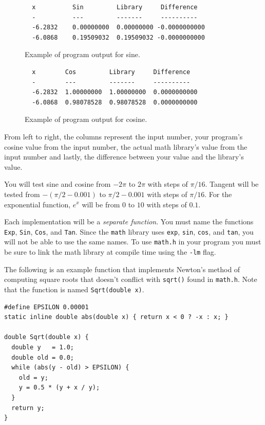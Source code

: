 \documentclass[11pt]{article}
\begin{document}
\begin{figure}[h]
\begin{centering}
  \begin{lstlisting}
  x          Sin         Library     Difference
  -          ---         -------     ----------
  -6.2832	 0.00000000	 0.00000000	-0.0000000000
  -6.0868	 0.19509032	 0.19509032	-0.0000000000\end{lstlisting}
  \caption{Example of program output for sine.}\label{sine}
\end{centering}
\end{figure}

\begin{figure}[h]
\begin{centering}
  \begin{lstlisting}
  x        Cos         Library     Difference
  -        ---         -------     ----------
  -6.2832  1.00000000  1.00000000  0.0000000000
  -6.0868  0.98078528  0.98078528  0.0000000000\end{lstlisting}
  \caption{Example of program output for cosine.}\label{cosine}
\end{centering}
\end{figure}
From left to right, the columns represent the input number, your program's
cosine value from the input number, the actual math library's value from the
input number and lastly, the difference between your value and the library's value.

You will test sine and cosine from $-2\pi$ to $2\pi$ with steps of $\pi/16$.
Tangent will be tested from $-(\pi/2 - 0.001)$ to $\pi/2 - 0.001$ with steps of
$\pi/16$. For the exponential function, $e^x$ will be from $0$ to $10$ with steps of $0.1$.

Each implementation will be a \emph{separate function}. You must
name the functions \texttt{Exp}, \texttt{Sin}, \texttt{Cos}, and
\texttt{Tan}. Since the \texttt{math} library uses \texttt{exp},
\texttt{sin}, \texttt{cos}, and \texttt{tan}, you will not be able
to use the same names. To use \texttt{math.h} in your program you
must be sure to link the math library at compile time using the
\texttt{-lm} flag.

The following is an example function that implements Newton's method
of computing square roots that doesn't conflict with \texttt{sqrt()}
found in \texttt{math.h}. Note that the function is named
\texttt{Sqrt(double x)}.

\begin{lstlisting}[title=Computing $\sqrt{x}$ using Newton's method.]
#define EPSILON 0.00001
static inline double abs(double x) { return x < 0 ? -x : x; }

double Sqrt(double x) {
  double y   = 1.0;
  double old = 0.0;
  while (abs(y - old) > EPSILON) {
    old = y;
    y = 0.5 * (y + x / y);
  }
  return y;
}
\end{lstlisting}
\end{document}

